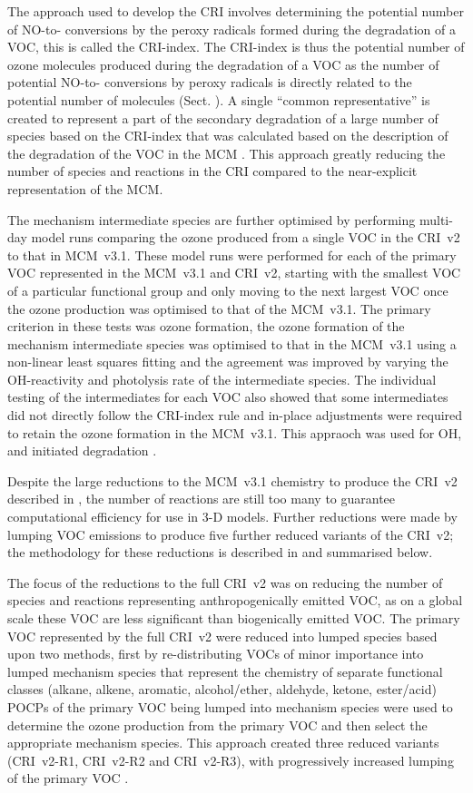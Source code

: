 The approach used to develop the CRI involves determining the potential number of NO-to- conversions by the peroxy radicals formed during the degradation of a VOC, this is called the CRI-index.
The CRI-index is thus the potential number of ozone molecules produced during the degradation of a VOC as the number of potential NO-to- conversions by peroxy radicals is directly related to the potential number of  molecules (Sect. ).
A single ``common representative'' is created to represent a part of the secondary degradation of a large number of species based on the CRI-index that was calculated based on the description of the degradation of the VOC in the MCM \citep{Jenkin:2008}.
This approach greatly reducing the number of species and reactions in the CRI compared to the near-explicit representation of the MCM.

The mechanism intermediate species are further optimised by performing multi-day model runs comparing the ozone produced from a single VOC in the CRI~v2 to that in MCM~v3.1.
These model runs were performed for each of the primary VOC represented in the MCM~v3.1 and CRI~v2, starting with the smallest VOC of a particular functional group and only moving to the next largest VOC once the ozone production was optimised to that of the MCM~v3.1.
The primary criterion in these tests was ozone formation, the ozone formation of the mechanism intermediate species was optimised to that in the MCM~v3.1 using a non-linear least squares fitting and the agreement was improved by varying the OH-reactivity and photolysis rate of the intermediate species.
The individual testing of the intermediates for each VOC also showed that some intermediates did not directly follow the CRI-index rule and in-place adjustments were required to retain the ozone formation in the MCM~v3.1.
This appraoch was used for OH,  and  initiated degradation \citep{Jenkin:2008}.

Despite the large reductions to the MCM~v3.1 chemistry to produce the CRI~v2 described in \citet{Jenkin:2008}, the number of reactions are still too many to guarantee computational efficiency for use in 3-D models.
Further reductions were made by lumping VOC emissions to produce five further reduced variants of the CRI~v2; the methodology for these reductions is described in \citet{Watson:2008} and summarised below.

The focus of the reductions to the full CRI~v2 was on reducing the number of species and reactions representing anthropogenically emitted VOC, as on a global scale these VOC are less significant than biogenically emitted VOC.
The primary VOC represented by the full CRI~v2 were reduced into lumped species based upon two methods, first by re-distributing VOCs of minor importance into lumped mechanism species that represent the chemistry of separate functional classes (alkane, alkene, aromatic, alcohol/ether, aldehyde, ketone, ester/acid)
POCPs of the primary VOC being lumped into mechanism species were used to determine the ozone production from the primary VOC and then select the appropriate mechanism species.
This approach created three reduced variants (CRI~v2-R1, CRI~v2-R2 and CRI~v2-R3), with progressively increased lumping of the primary VOC \citep{Watson:2008}.


